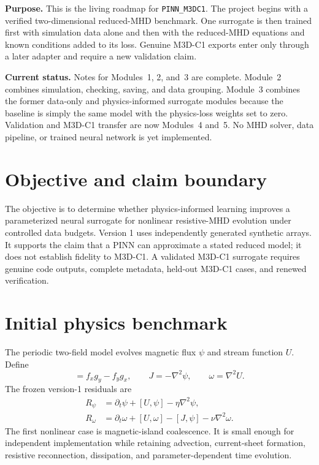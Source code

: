 \documentclass[11pt]{article}
\begin{document}

\begin{overviewbox}
\textbf{Purpose.} This is the living roadmap for \texttt{PINN\_M3DC1}. The project begins with a verified two-dimensional reduced-MHD benchmark. One surrogate is then trained first with simulation data alone and then with the reduced-MHD equations and known conditions added to its loss. Genuine M3D-C1 exports enter only through a later adapter and require a new validation claim.
\end{overviewbox}

\begin{notebox}
\textbf{Current status.} Notes for Modules~1, 2, and~3 are complete. Module~2 combines simulation, checking, saving, and data grouping. Module~3 combines the former data-only and physics-informed surrogate modules because the baseline is simply the same model with the physics-loss weights set to zero. Validation and M3D-C1 transfer are now Modules~4 and~5. No MHD solver, data pipeline, or trained neural network is yet implemented.
\end{notebox}

\ProjectTOC

\clearpage

\section{Objective and claim boundary}
The objective is to determine whether physics-informed learning improves a parameterized neural surrogate for nonlinear resistive-MHD evolution under controlled data budgets. Version 1 uses independently generated synthetic arrays. It supports the claim that a PINN can approximate a stated reduced model; it does not establish fidelity to M3D-C1. A validated M3D-C1 surrogate requires genuine code outputs, complete metadata, held-out M3D-C1 cases, and renewed verification.

\section{Initial physics benchmark}
The periodic two-field model evolves magnetic flux $\psi$ and stream function $U$. Define
\begin{equation}
 [f,g]=f_xg_y-f_yg_x,\qquad J=-\nabla^2\psi,\qquad \omega=\nabla^2U .
\end{equation}
The frozen version-1 residuals are
\begin{align}
 R_\psi &= \partial_t\psi+[U,\psi]-\eta\nabla^2\psi,\\
 R_\omega &= \partial_t\omega+[U,\omega]-[J,\psi]-\nu\nabla^2\omega .
\end{align}
The first nonlinear case is magnetic-island coalescence. It is small enough for independent implementation while retaining advection, current-sheet formation, resistive reconnection, dissipation, and parameter-dependent time evolution.
\end{document}
